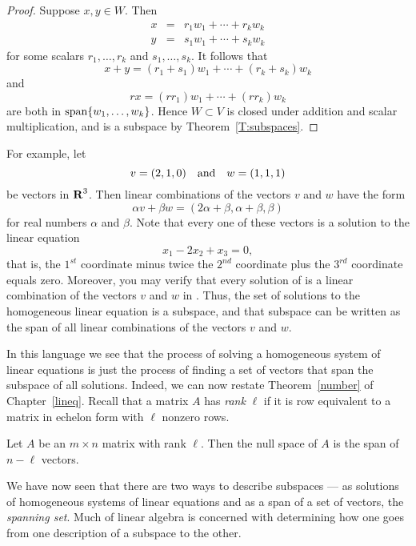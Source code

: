 \documentclass{ximera}
\begin{document}
\begin{proof}  Suppose $x,y\in W$.  Then
\begin{eqnarray*}
x & = & r_1w_1 + \cdots + r_kw_k \\
y & = & s_1w_1 + \cdots + s_kw_k
\end{eqnarray*}
for some scalars $r_1,\ldots,r_k$ and $s_1,\ldots,s_k$.  It
follows that
\[
x+y = (r_1+s_1)w_1 + \cdots + (r_k+s_k)w_k
\]
and
\[
rx = (rr_1)w_1 + \cdots + (rr_k)w_k
\]
are both in ${\rm span}\{w_1,\ldots,w_k\}$. Hence $W\subset V$ is
closed under addition and scalar multiplication, and is a
subspace by Theorem~\ref{T:subspaces}. \end{proof}

For example, let
\begin{equation}  \label{e:vandw}
v=(2,1,0) \AND w=(1,1,1)
\end{equation}
be vectors in $\mbox{$\bf{R}$}^3$. Then linear combinations of the vectors
$v$ and $w$ have the form
\[
\alpha v + \beta w = (2\alpha+\beta, \alpha+\beta, \beta)
\]
for real numbers $\alpha$ and $\beta$.  Note that every one of
these vectors is a solution to the linear equation
\begin{equation} \label{ex1}
x_1 - 2x_2 + x_3 = 0,
\end{equation}
that is, the $1^{st}$ coordinate minus twice the $2^{nd}$ coordinate 
plus the $3^{rd}$ coordinate equals zero.  Moreover, you may verify 
that every solution of  is a linear combination
of the vectors $v$ and $w$ in .  Thus, the set of
solutions to the homogeneous linear equation
 is a
subspace, and that subspace can be written as the span of
all linear combinations of the vectors $v$ and $w$.

In this language we see that the process of solving a
homogeneous system of linear equations is just the process of
finding a set of vectors that span the subspace of all
solutions.  Indeed,
we can now restate Theorem~\ref{number} of Chapter~\ref{lineq}.
Recall that a matrix $A$ has {\em rank\/} $\ell$ if it is row
equivalent to a matrix in echelon form with $\ell$ nonzero rows.

\begin{prop}  \label{P:n-rank}
Let $A$ be an $m\times n$ matrix with rank $\ell$. Then the
null space of $A$ is the span of $n-\ell$ vectors.
\end{prop}  

We have now seen that there are two ways to describe subspaces ---
as solutions of homogeneous systems of linear equations and as a
span of a set of vectors, the {\em spanning set}.
Much of linear algebra is concerned
with determining how one goes from one description of a subspace
to the other.
\end{document}
